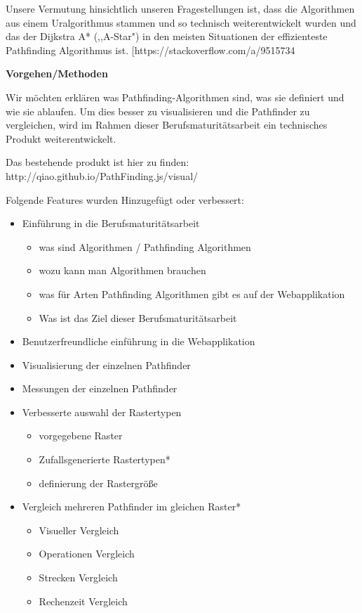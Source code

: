 Unsere Vermutung hinsichtlich unseren Fragestellungen ist, dass die
Algorithmen aus einem Uralgorithmus stammen und so technisch
weiterentwickelt wurden und das der Dijkstra A* (,,A-Star") in den
meisten Situationen der effizienteste Pathfinding Algorithmus ist.
{[}https://stackoverflow.com/a/9515734

\textbf{Vorgehen/Methoden}

Wir möchten erklären was Pathfinding-Algorithmen sind, was sie definiert
und wie sie ablaufen. Um dies besser zu visualisieren und die Pathfinder
zu vergleichen, wird im Rahmen dieser Berufsmaturitätsarbeit ein
technisches Produkt weiterentwickelt.

Das bestehende produkt ist hier zu finden:
http://qiao.github.io/PathFinding.js/visual/

Folgende Features wurden Hinzugefügt oder verbessert:

\begin{itemize}
\item
  Einführung in die Berufsmaturitätsarbeit

  \begin{itemize}
  \item
    was sind Algorithmen / Pathfinding Algorithmen
  \item
    wozu kann man Algorithmen brauchen
  \item
    was für Arten Pathfinding Algorithmen gibt es auf der Webapplikation
  \item
    Was ist das Ziel dieser Berufsmaturitätsarbeit
  \end{itemize}
\end{itemize}

\begin{itemize}
\item
  Benutzerfreundliche einführung in die Webapplikation
\item
  Visualisierung der einzelnen Pathfinder
\item
  Messungen der einzelnen Pathfinder
\item
  Verbesserte auswahl der Rastertypen

  \begin{itemize}
  \item
    vorgegebene Raster
  \item
    Zufallsgenerierte Rastertypen*
  \item
    definierung der Rastergröße
  \end{itemize}
\item
  Vergleich mehreren Pathfinder im gleichen Raster*

  \begin{itemize}
  \item
    Visueller Vergleich
  \item
    Operationen Vergleich
  \item
    Strecken Vergleich
  \item
    Rechenzeit Vergleich
  \end{itemize}
\end{itemize}

